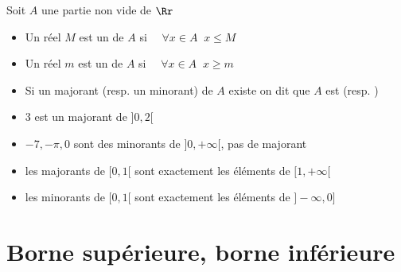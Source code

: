\begin{frame}

\begin{mydefinition}
Soit $A$ une partie non vide de $\Rr$
\begin{itemize}
  \item  Un réel $M$ est un 
 de $A$ si \ \ $\forall x \in A \;\; x\leq M$
\pause
  \item Un réel $m$ est un  de $A$ si \ \ $\forall x \in A \;\; x\geq m$
\pause
  \item Si un majorant (resp. un minorant) de $A$ existe on dit que $A$ est  (resp. )
\end{itemize}
\end{mydefinition}

\pause
\begin{exemple}
\begin{itemize}
  \item $3$ est un majorant de $]0,2[$
\pause
  \item $-7,-\pi,0$ sont des minorants de $]0,+\infty[$, pas de majorant
\pause
  \item les majorants de $[0,1[$ sont exactement les éléments de $[1,+\infty[$
\pause
  \item les minorants de $[0,1[$ sont exactement les éléments de $]-\infty,0]$
\pause
{}
\end{itemize}
\end{exemple}

\end{frame}




\section*{Borne supérieure, borne inférieure}

